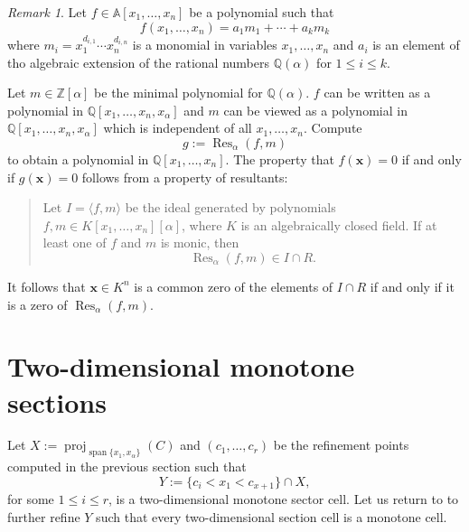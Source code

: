 \documentclass[
]{book}
\theoremstyle{definition}
\theoremstyle{definition}
\theoremstyle{definition}
\theoremstyle{definition}
\theoremstyle{remark}
\newtheorem*{remark}{Remark}
\begin{document}
\begin{remark}

Let \(f \in \mathbb{A}[x_1,\ldots,x_n]\) be a polynomial such that
\[
f(x_1,\ldots,x_n) = a_1 m_1 + \cdots + a_k m_k
\]
where \(m_i = x_1^{d_{i,1}} \cdots x_n^{d_{i,n}}\) is a monomial in variables \(x_1,\ldots,x_n\) and \(a_i\) is an element of tho algebraic extension of the rational numbers \(\mathbb{Q}(\alpha)\) for \(1 \le i \le k\).

Let \(m \in \mathbb{Z}[\alpha]\) be the minimal polynomial for \(\mathbb{Q}(\alpha)\). \(f\) can be written as a polynomial in \(\mathbb{Q}[x_1,\ldots,x_n,x_\alpha]\) and \(m\) can be viewed as a polynomial in \(\mathbb{Q}[x_1,\ldots,x_n,x_\alpha]\) which is independent of all \(x_1,\ldots,x_n\). Compute
\[
g := \operatorname{Res}_\alpha (f,m)
\]
to obtain a polynomial in \(\mathbb{Q}[x_1,\ldots,x_n]\). The property that \(f(\mathbf{x}) = 0\) if and only if \(g(\mathbf{x}) = 0\) follows from a property of resultants:

\begin{quote}
Let \(I = \langle f, m \rangle\) be the ideal generated by polynomials \(f, m \in K[x_1,\ldots,x_n][\alpha]\), where \(K\) is an algebraically closed field.
If at least one of \(f\) and \(m\) is monic, then
\[
\operatorname{Res}_\alpha (f,m) \in I \cap R.
\]
\end{quote}

It follows that \(\mathbf{x} \in K^n\) is a common zero of the elements of \(I \cap R\) if and only if it is a zero of \(\operatorname{Res}_\alpha(f,m)\).

\end{remark}

\hypertarget{sec:monotone-sections}{%
\section{Two-dimensional monotone sections}\label{sec:monotone-sections}}

Let \(X := {\operatorname{proj}_{{\operatorname{span} \{x_1,x_\alpha\}}}}(C)\) and \((c_1,\ldots,c_r)\) be the refinement points computed in the previous section such that
\[
Y := \{ c_i < x_1 < c_{x+1}\} \cap X,
\]
for some \(1 \le i \le r\), is a two-dimensional monotone sector cell.
Let us return to \citep[Theorem 3.18]{bgv15} to further refine \(Y\) such that every two-dimensional section cell is a monotone cell.
\end{document}
